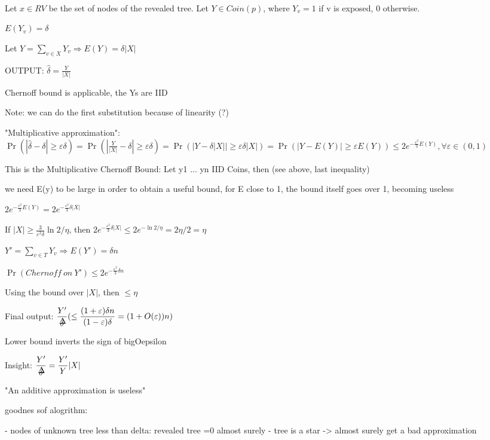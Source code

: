 \documentclass{report}
\begin{document}
	\
	
	Let $x \in RV$ be the set of nodes of the revealed tree. Let $Y \in Coin(p)$, where $Y_v = 1$ if v is exposed, 0 otherwise.
	
	$E(Y_v) = \delta$
	
	Let $ Y = \sum_{v \in X} Y_v \Rightarrow E(Y)= \delta |X|$
	
	OUTPUT: $\hat\delta = \frac{Y}{|X|}$
	
	Chernoff bound is applicable, the Ys are IID
	
	Note: we can do the first substitution because of linearity (?)
	
	"Multiplicative approximation": $\displaystyle \Pr(|\hat\delta - \delta| \geq \varepsilon \delta) = \Pr(|\frac{Y}{|X|} - \delta| \geq \varepsilon \delta) = \Pr(|Y - \delta |X|| \geq \varepsilon \delta |X|) = \Pr(|Y - E(Y)| \geq \varepsilon E(Y)) \leq 2e^{-\frac{\varepsilon^2}{3}E(Y)}, \forall \varepsilon \in (0, 1)$
	
	This is the Multiplicative Chernoff Bound: Let y1 ... yn IID Coins, then (see above, last inequality)
	
	we need E(y) to be large in order to obtain a useful bound, for E close to 1, the bound itself goes over 1, becoming useless
	
	$\displaystyle 2e^{-\frac{\varepsilon^2}{3}E(Y)} = 2e^{-\frac{\varepsilon^2}{3}\delta|X|}$
	
	If $\displaystyle |X| \geq \frac{3}{\varepsilon^2\delta}\ln2/\eta$, then $\displaystyle 2e^{-\frac{\varepsilon^2}{3}\delta|X|} \leq 2e^{-\ln2/\eta} = 2\eta/2 = \eta$
	
	$Y' = \sum_{v \in T}Y_v \Rightarrow E(Y') = \delta n$
	
	$\Pr(Chernoff\ on\ Y') \leq 2e^{-\frac{\varepsilon^2}{3}\delta n}$
	
	Using the bound over $|X|$, then $\leq \eta$
	
	Final output: $\displaystyle \frac{Y'}{\mathaccent 1 \delta } (\leq  \frac{(1 + \varepsilon)\delta n}{(1 - \varepsilon)\delta} = (1+O(\varepsilon))n )$
	
	Lower bound inverts the sign of bigOepsilon
	
	Insight: $\displaystyle \frac{Y'}{\mathaccent 1 \delta } = \frac{Y'}{Y}|X|$
	
	
	
	"An additive approximation is useless"
	
	
	goodnes sof alogrithm:
	
	 - nodes of unknown tree less than delta: revealed tree =0 almost surely
	 - tree is a star -> almost surely get a bad approximation
	 
\end{document}
